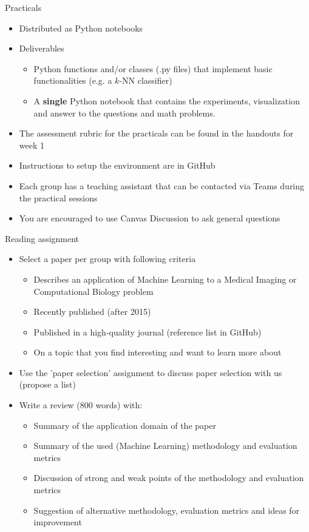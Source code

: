 \documentclass[notes]{beamer}          %
\begin{document}
\begin{frame}{Practicals}
\begin{itemize}
    \item Distributed as Python notebooks
    \item Deliverables
    \begin{itemize}
        \item Python functions and/or classes (.py files) that implement basic functionalities (e.g. a $k$-NN classifier)
        \item A \textbf{single} Python notebook that contains the experiments, visualization and answer to the questions and math problems.
    \end{itemize}
    \item The assessment rubric for the practicals can be found in the handouts for week 1
    \item Instructions to setup the environment are in GitHub
    \item Each group has a teaching assistant that can be contacted via Teams during the practical sessions
    	\item You are encouraged to use Canvas Discussion to ask general questions
\end{itemize}    
\end{frame}

\begin{frame}{Reading assignment}
\begin{itemize}
    \item Select a paper per group with following criteria
    \begin{itemize}
        \item Describes an application of Machine Learning to a Medical Imaging or Computational Biology problem
		\item Recently published (after 2015)
		\item Published in a high-quality journal (reference list in GitHub)
		\item	 On a topic that you find interesting and want to learn more about
    \end{itemize}
    \item Use the 'paper selection' assignment to discuss paper selection with us (propose a list)
    \item Write a review (800 words) with:
    \begin{itemize}
    		\item Summary of the application domain of the paper
    		\item Summary of the used (Machine Learning) methodology and evaluation metrics
		\item Discussion of strong and weak points of the methodology and evaluation metrics
		\item Suggestion of alternative methodology, evaluation metrics and ideas for improvement
    \end{itemize}
\end{itemize}    
\end{frame}
\end{document}
